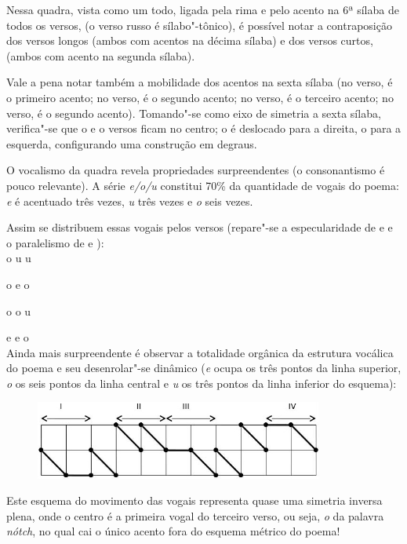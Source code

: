 {Nessa quadra, vista como um todo, ligada pela rima  e pelo acento na
6ª sílaba de todos os versos, (o verso russo é sílabo"-tônico), é
possível notar a contraposição dos versos longos (ambos com acentos na
décima sílaba) e dos versos curtos, (ambos com acento na segunda
sílaba).

Vale a pena notar também a mobilidade dos acentos na sexta sílaba (no 
verso, é o primeiro acento; no  verso, é o segundo acento; no 
verso, é o terceiro acento; no  verso, é o segundo acento). Tomando"-se
como eixo de simetria a sexta sílaba, verifica"-se que o  e o  versos
ficam no centro; o  é deslocado para a direita, o  para a esquerda,
configurando uma construção em degraus.

O vocalismo da quadra revela propriedades surpreendentes (o
consonantismo é pouco relevante). A série \emph{e/o/u} constitui 70\% da
quantidade de vogais do poema: \emph{e} é acentuado três vezes, \emph{u}
três vezes e \emph{o} seis vezes.

Assim se distribuem essas vogais pelos versos (repare"-se a
especularidade de  e  e o paralelismo de  e ): \\

o u u

o e o

o o u

e e o \\

Ainda mais surpreendente é observar a totalidade orgânica da estrutura
vocálica do poema e seu desenrolar"-se dinâmico (\emph{e} ocupa os três
pontos da linha superior, \emph{o} os seis pontos da linha central e
\emph{u} os três pontos da linha inferior do esquema):

\begin{figure}[!ht]
\centering
  \includegraphics[width=95mm]{./imgs/fig5.jpg}
\end{figure}

Este esquema do movimento das vogais representa quase uma simetria
inversa plena, onde o centro é a primeira vogal do terceiro verso, ou
seja, \emph{o} da palavra \emph{nótch}, no qual cai o único
acento fora do esquema métrico do poema!

}
